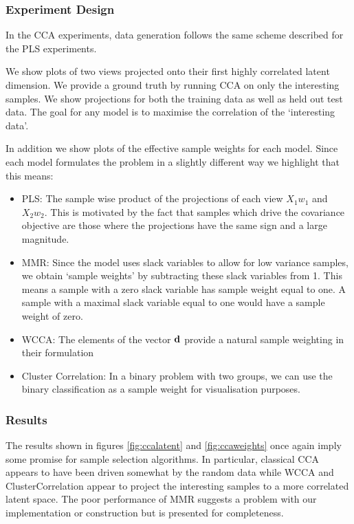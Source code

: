 \subsubsection{Experiment Design}

In the CCA experiments, data generation follows the same scheme described for the PLS experiments.

We show plots of two views projected onto their first highly correlated latent dimension. We provide a ground truth by running CCA on only the interesting samples. We show projections for both the training data as well as held out test data. The goal for any model is to maximise the correlation of the `interesting data'.

In addition we show plots of the effective sample weights for each model. Since each model formulates the problem in a slightly different way we highlight that this means:

\begin{itemize}
    \item PLS: The sample wise product of the projections of each view $X_1w_1$ and $X_2w_2$. This is motivated by the fact that samples which drive the covariance objective are those where the projections have the same sign and a large magnitude.
    \item MMR: Since the model uses slack variables to allow for low variance samples, we obtain `sample weights' by subtracting these slack variables from 1. This means a sample with a zero slack variable has sample weight equal to one. A sample with a maximal slack variable equal to one would have a sample weight of zero.
    \item WCCA: The elements of the vector $\bold{d}$ provide a natural sample weighting in their formulation
    \item Cluster Correlation: In a binary problem with two groups, we can use the binary classification as a sample weight for visualisation purposes.
\end{itemize}

\subsubsection{Results}

The results shown in figures \ref{fig:ccalatent} and \ref{fig:ccaweights} once again imply some promise for sample selection algorithms. In particular, classical CCA appears to have been driven somewhat by the random data while WCCA and ClusterCorrelation appear to project the interesting samples to a more correlated latent space. The poor performance of MMR suggests a problem with our implementation or construction but is presented for completeness.

